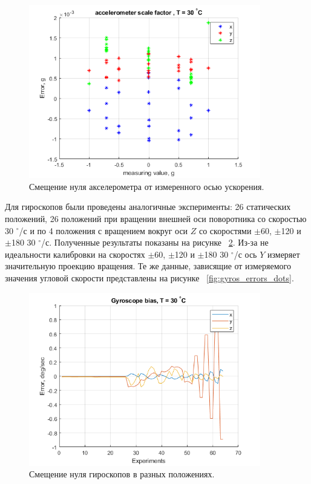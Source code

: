 \documentclass[a4paper,12pt]{article}
\begin{document}
\begin{figure}
\centering
\includegraphics[width=0.9\textwidth]{accelscale.png} 
\caption{\label{fig:accelscale}   Смещение нуля акселерометра от измеренного осью ускорения.}
\end{figure}

Для гироскопов были проведены аналогичные эксперименты: 26 статических положений, 26 положений при вращении внешней оси поворотника со скоростью 30 $^{\circ}$/с и по 4 положения с вращением вокруг оси $Z$ со скоростями $\pm$60, $\pm$120 и $\pm$180 30 $^{\circ}$/с. Полученные результаты показаны на рисунке ~\ref{fig:gyros_errors}. Из-за не идеальности калибровки на скоростях $\pm$60, $\pm$120 и $\pm$180 30 $^{\circ}$/с ось $Y$ измеряет значительную проекцию вращения. Те же данные, зависящие от измеряемого значения угловой скорости представлены на рисунке ~\ref{fig:gyros_errors_dots}.

\begin{figure}
\centering
\includegraphics[width=0.9\textwidth]{gyros_errors.png} 
\caption{\label{fig:gyros_errors}  Смещение нуля гироскопов в разных положениях.}
\end{figure}
\end{document}
